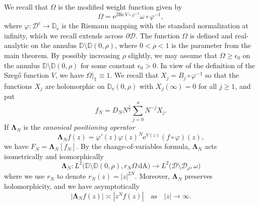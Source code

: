 \documentclass{amsart}
\newcommand{\be}{\begin{equation}}
\newcommand{\ee}{\end{equation}}
\newcommand{\D}{\mathbb{D}}
\newcommand{\T}{\mathbb{T}}
\newcommand{\calD}{\mathcal{D}}
\newcommand{\diffA}{\mathrm{dA}}
\newcommand{\Lamop}{\mathbf{\Lambda}}
\theoremstyle{definition}
\theoremstyle{remark}
\newcommand{\e}{\mathrm{e}}
\renewcommand{\Re}{\mathrm{Re}\,}
\numberwithin{equation}{subsection}
\begin{document}
We recall that $\Omega$ is the modified weight function given by
\be\label{eq:def-mod-weight}
\Omega=\e^{2\Re V\circ\varphi^{-1}}\omega\circ\varphi^{-1},
\ee
where $\varphi:\calD^c\to\D_\e$ is the Riemann mapping
with the standard normalization at infinity, which we 
recall extends across $\partial\calD$. 
The function $\Omega$ is 
defined and real-analytic on the annulus 
$\D\setminus\D(0,\rho)$,
where $0<\rho<1$ is the parameter from the main theorem. 
By possibly increasing $\rho$ slightly, we may assume that 
$\Omega\ge \epsilon_0$ on the annulus $\D\setminus\D(0,\rho)$ for some constant 
$\epsilon_0>0$. 
In view of the definition of
the Szeg\H{o} function $V$, we have $\Omega\vert_{\T}\equiv 1$.
We recall that $X_j=B_j\circ\varphi^{-1}$ so that the 
functions $X_j$ are holomorphic on $\D_\e(0,\rho)$ with 
$X_j(\infty)=0$ for all $j\ge 1$, and put
\be\label{eq:fN-def}
f_N=D_N N^{\frac12}\sum_{j=0}^\varkappa N^{-j}X_j.
\ee
If $\Lamop_N$ is the {\em canonical positioning operator}
\be\label{eq:Lamop-def}
\Lamop_N f(z)= \varphi'(z)\varphi(z)^N\e^{V(z)} (f\circ\varphi)(z),
\ee
we have $F_N=\Lamop_N[f_N]$. By the change-of-variables
formula, $\Lamop_N$
acts isometrically and isomorphically
\be\label{eq:Lamop-isom}
\Lamop_N:L^2\big(\D\setminus\D(0,\rho),r_N\Omega\, \diffA\big)\to 
L^2\big(\calD\setminus\calD_\rho,\omega\big)
\ee
where we use $r_{N}$ to denote $r_{N}(z)=|z|^{2N}$.
Moreover, $\Lamop_N$ preserves holomorphicity, and we have 
asymptotically
\be\label{eq:Lamop-asymp}
|\Lamop_N f (z)| \asymp |z^N f(z)|\quad  
\text{as}\quad |z|\to\infty.
\ee
\end{document}

